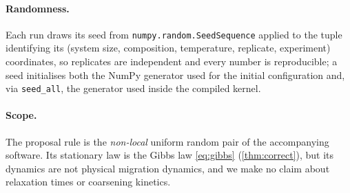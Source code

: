 \paragraph{Randomness.} Each run draws its seed from \texttt{numpy.random.SeedSequence} applied to the tuple identifying its (system size, composition, temperature, replicate, experiment) coordinates, so replicates are independent and every number is reproducible; a seed initialises both the NumPy generator used for the initial configuration and, via \texttt{seed\_all}, the generator used inside the compiled kernel.

\paragraph{Scope.} The proposal rule is the \emph{non-local} uniform random pair of the accompanying software. Its stationary law is the Gibbs law \eqref{eq:gibbs} (\cref{thm:correct}), but its dynamics are not physical migration dynamics, and we make no claim about relaxation times or coarsening kinetics.

